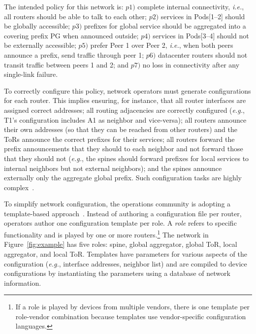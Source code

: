\documentclass[numbers, 10pt, preprint]{sigplanconf}
\newcommand{\todo}[1]{\textcolor{red}{[TODO: #1]}}
\newcommand{\EG}{\emph{e.g.}}
\newcommand{\IE}{\emph{i.e.}}
\begin{document}


The intended policy for this network is:
$p1)$ complete internal connectivity, \IE, all routers should be able to talk to each other;
$p2)$ services in Pods[1--2] should be globally accessible;
$p3)$ prefixes for global service should be aggregated into a covering prefix PG when announced outside;
$p4)$ services in Pods[3--4] should not be externally accessible;
$p5)$ prefer Peer 1 over Peer 2, \IE, when both peers announce a prefix, send traffic through peer 1;
$p6)$ datacenter routers should not transit traffic between peers 1 and 2; and
$p7)$ no loss in connectivity after any single-link failure.

To correctly configure this policy, network operators must generate configurations for each router. This implies ensuring, for instance, that all router interfaces are assigned correct addresses; all routing adjacencies are correctly configured (\EG, T1's configuration includes A1 as neighbor and vice-versa); all routers announce their own addresses (so that they can be reached from other routers) and the ToRs announce the correct prefixes for their services; all routers  forward the prefix announcements that they should to each neighbor and not forward those that they should not (\EG, the spines should forward prefixes for local services to internal neighbors but not external neighbors); and the spines announce externally only the aggregate global prefix. Such configuration tasks are highly complex~\cite{juniper-study,bgpmon,batfish,propane}.

To simplify network configuration, the operations community is adopting a template-based approach~\cite{hatch,thwack}. Instead of authoring a configuration file per router, operators author one configuration template per role.
%
A {\em role} refers to specific functionality and is played by one or more routers.\footnote{If a role is played by devices from multiple vendors, there is one template per role-vendor combination because templates use vendor-specific configuration languages.}
%
The network in Figure~\ref{fig:example} has five roles: spine, global aggregator, global ToR, local aggregator, and local ToR.
%
Templates have parameters for various aspects of the configuration (\EG, interface addresses, neighbor list) and are compiled to device configurations by instantiating the parameters using a database of network information.
\end{document}
